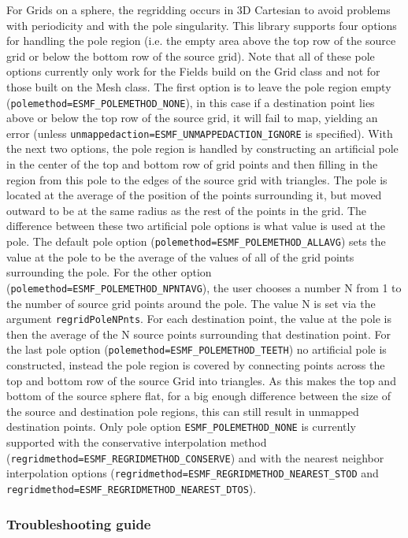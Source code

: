 For Grids on a sphere, the regridding occurs in 3D Cartesian to avoid
problems with periodicity and with the pole singularity. This library
 supports four options for handling the pole region (i.e. the empty area above the top row of the source grid or below
 the bottom row of the source grid).  Note that all of these pole options currently only work for the Fields build on the Grid class and not for those built on 
 the Mesh class. The first option is to leave the pole region empty ({\tt polemethod=ESMF\_POLEMETHOD\_NONE}), in this 
 case if a destination point lies above or below the 
 top row of the source grid, it will fail to map, yielding an error (unless {\tt unmappedaction=ESMF\_UNMAPPEDACTION\_IGNORE} is specified).  
 With the next two options, the pole region is handled by constructing 
 an artificial pole in the center of the top and bottom row of grid points and then filling
 in the region from this pole to the edges of the source grid with triangles. 
 The pole is located at the average of the position of the points surrounding
 it, but moved outward to be at the same radius as the rest of the points
 in the grid. The difference between these two artificial pole options is what value is used at the pole. 
 The default pole option ({\tt polemethod=ESMF\_POLEMETHOD\_ALLAVG}) sets the value at the pole to be the average of the values
 of all of the grid points surrounding the pole. For the other option ({\tt polemethod=ESMF\_POLEMETHOD\_NPNTAVG}), the user chooses
 a number N from 1 to the number of source grid points around the pole. The value N is set via the argument {\tt regridPoleNPnts}. For
 each destination point, the value at the pole is then the average of the N source points
 surrounding that destination point. For the last pole option ({\tt polemethod=ESMF\_POLEMETHOD\_TEETH}) no artificial pole is constructed, instead the
 pole region is covered by connecting points across the top and bottom row of the source Grid into triangles. As 
 this makes the top and bottom of the source sphere flat, for a big enough difference between the size of
 the source and destination pole regions, this can still result in unmapped destination points.  
 Only pole option {\tt ESMF\_POLEMETHOD\_NONE} is currently supported with the conservative interpolation method 
 ({\tt regridmethod=ESMF\_REGRIDMETHOD\_CONSERVE}) and with the nearest neighbor interpolation options ({\tt regridmethod=ESMF\_REGRIDMETHOD\_NEAREST\_STOD}
 and {\tt regridmethod=ESMF\_REGRIDMETHOD\_NEAREST\_DTOS}).


\subsubsection{Troubleshooting guide}

